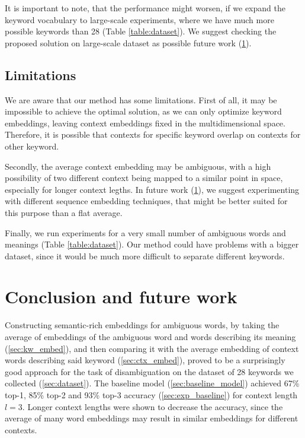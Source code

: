 \documentclass{llncs}
\begin{document}
It is important to note, that the performance might worsen, if we expand the keyword vocabulary to large-scale experiments, where we have much more possible keywords than 28 (Table \ref{table:dataset}).
We suggest checking the proposed solution on large-scale dataset as possible future work (\ref{sec:conclusion}).

\subsection{Limitations}
\label{sec:limitations}
We are aware that our method has some limitations.
First of all, it may be impossible to achieve the optimal solution, as we can only optimize keyword embeddings, leaving context embeddings fixed in the multidimensional space.
Therefore, it is possible that contexts for specific keyword overlap on contexts for other keyword.

Secondly, the average context embedding may be ambiguous, with a high possibility of two different context being mapped to a similar point in space, especially for longer context legths.
In future work (\ref{sec:conclusion}), we suggest experimenting with different sequence embedding techniques, that might be better suited for this purpose than a flat average.

Finally, we run experiments for a very small number of ambiguous words and meanings (Table \ref{table:dataset}). Our method could have problems with a bigger dataset, since it would be much more difficult to separate different keywords.


\section{Conclusion and future work}
\label{sec:conclusion}
Constructing semantic-rich embeddings for ambiguous words, by taking the average of embeddings of the ambiguous word and words describing its meaning (\ref{sec:kw_embed}), and then comparing it with the average embedding of context words describing said keyword (\ref{sec:ctx_embed}), proved to be a surprisingly good approach for the task of disambiguation on the dataset of 28 keywords we collected (\ref{sec:dataset}).
The baseline model (\ref{sec:baseline_model}) achieved 67\% top-1, 85\% top-2 and 93\% top-3 accuracy (\ref{sec:exp_baseline}) for context length \(l=3\). Longer context lengths were shown to decrease the accuracy, since the average of many word embeddings may result in similar embeddings for different contexts.
\end{document}
